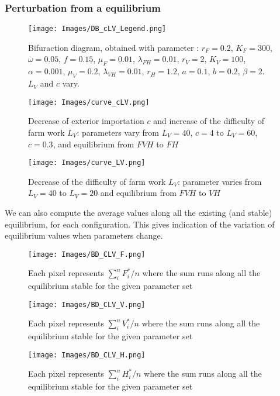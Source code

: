 \documentclass{article}
\newcommand{\lf}{\lambda_{FH}}
\newcommand{\lv}{\lambda_{VH}}
\begin{document}
\subsubsection{Perturbation from a equilibrium}
\begin{figure}[!ht]
\centering
\texttt{[image: Images/DB\_cLV\_Legend.png]}
\caption{Bifuraction diagram, obtained with parameter : $r_F = 0.2$, $K_F=300$, $\omega=0.05$, $f=0.15$, $\mu_F=0.01$, $\lf=0.01$, $r_V=2$, $K_V=100$, $\alpha=0.001$, $\mu_V=0.2$, $\lv=0.01$, $r_H=1.2$, $a=0.1$, $b=0.2$, $\beta=2$. $L_V$ and $c$ vary.}
\end{figure}


\begin{figure}[!ht]
\centering
\texttt{[image: Images/curve\_cLV.png]}
\caption{Decrease of exterior importation $c$ and increase of the difficulty of farm work $L_V$: parameters vary from $L_V = 40$, $c=4$ to $L_V = 60$, $c=0.3$, and equilibrium from $FVH$ to $FH$ }
\end{figure}

\begin{figure}[!ht]
\centering
\texttt{[image: Images/curve\_LV.png]}
\caption{Decrease of the difficulty of farm work $L_V$: parameter varies from $L_V = 40$ to $L_V = 20$ and equilibrium from $FVH$ to $VH$ }
\end{figure}

\newpage
We can also compute the average values along all the existing (and stable) equilibrium, for each configuration. This gives indication of the variation of equilibrium values when parameters change.

\begin{figure}[!ht]
\centering
\texttt{[image: Images/BD\_CLV\_F.png]}
\caption{Each pixel represents $\sum_i^n F^*_i / n$ where the sum runs along all the equilibrium stable for the given parameter set}
\end{figure}

\begin{figure}[!ht]
\centering
\texttt{[image: Images/BD\_CLV\_V.png]}
\caption{Each pixel represents $\sum_i^n V^*_i / n$ where the sum runs along all the equilibrium stable for the given parameter set}
\end{figure}

\begin{figure}[!ht]
\centering
\texttt{[image: Images/BD\_CLV\_H.png]}
\caption{Each pixel represents $\sum_i^n H^*_i / n$ where the sum runs along all the equilibrium stable for the given parameter set}
\end{figure}
\end{document}

